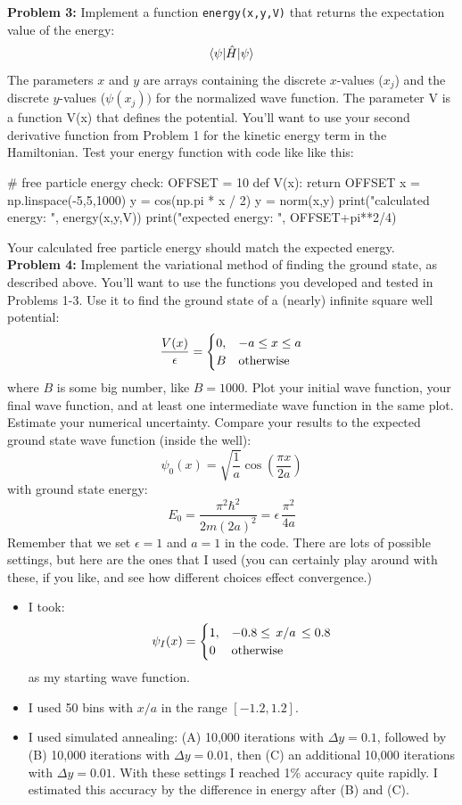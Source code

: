 \documentclass[12pt]{article}
\begin{document}
\noindent
{\bf Problem 3:}  Implement a function {\tt energy(x,y,V)} that returns the expectation value of the energy:
$$\braket{\psi|\hat{H}|\psi}$$
The parameters $x$ and $y$ are arrays containing the discrete $x$-values ($x_j$) and the discrete $y$-values ($\psi(x_j))$ for the normalized wave function.  The parameter V is a function V(x) that defines the potential. You'll want to use your second derivative function from Problem 1 for the kinetic energy term in the Hamiltonian.  Test your energy function with code like like this:
\begin{python}
# free particle energy check:
OFFSET = 10
def V(x):
    return OFFSET
x  = np.linspace(-5,5,1000)
y  = cos(np.pi * x / 2)
y = norm(x,y)
print("calculated energy: ", energy(x,y,V))
print("expected energy:   ", OFFSET+pi**2/4)
\end{python}
Your calculated free particle energy should match the expected energy.\\[5pt]

\noindent
{\bf Problem 4:}  Implement the variational method of finding the ground state, as described above.  You'll want to use the functions you developed and tested in Problems 1-3.  Use it to find the ground state of a (nearly) infinite square well potential:
$$\frac{V(x)}{\epsilon} = \begin{cases}
0, & -a \leq x \leq a \\
B     & {\rm otherwise} \\
\end{cases}
$$
where $B$ is some big number, like $B=1000$.  Plot your initial wave function, your final wave function, and at least one intermediate wave function in the same plot. Estimate your numerical uncertainty.  Compare your results to the expected ground state wave function (inside the well):
$$\psi_0(x) = \sqrt{\frac{1}{a}}\cos\left(\frac{\pi x}{2 a}\right)$$
with ground state energy:
$$E_0 = \frac{\pi^2 \hbar^2}{2m(2a)^2} = \epsilon \, \frac{\pi^2}{4a} $$
Remember that we set $\epsilon=1$ and $a=1$ in the code.  
There are lots of possible settings, but here are the ones that I used 
(you can certainly play around with these, if you like, and see how different choices effect convergence.)
\begin{itemize}
\item I took:
$$\psi_I(x) = \begin{cases}
1, & -0.8 \leq \, x/a \, \leq 0.8 \\
0     & {\rm otherwise} \\
\end{cases}
$$
as my starting wave function.
\item I used 50 bins with $x/a$ in the range $[-1.2, 1.2]$.
\item I used simulated annealing:  (A) 10,000 iterations with $\Delta y = 0.1$, followed by (B) 10,000 iterations with $\Delta y = 0.01$, then (C) an additional 10,000 iterations with $\Delta y = 0.01$.  With these settings I reached 1\% accuracy quite rapidly.  I estimated this accuracy by the difference in energy after (B) and (C).
\end{itemize}
\end{document}
